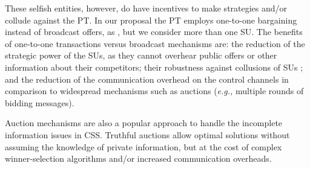 These selfish entities, however, do have incentives to make strategies and/or collude against the PT. 
In our proposal the PT employs one-to-one bargaining instead of broadcast offers, as \cite{ref:Yan2013}, but we consider more than one SU. The benefits of one-to-one transactions versus broadcast mechanisms \cite{ref:Feng2014,ref:Duan2014,ref:Jayaweera2011,ref:Zhang2009,ref:Simeone2008} are: the reduction of the strategic power of the SUs, as they cannot overhear public offers or other information about their competitors; their robustness against collusions of SUs \cite{ref:Alcaraz2014_coa}; and the reduction of the communication overhead on the control channels in comparison to widespread mechanisms such as auctions \cite{ref:Feng2014, ref:Jayaweera2011} (\textit{e.g.,} multiple rounds of bidding messages).

Auction mechanisms are also a popular approach to handle the incomplete information issues in CSS.
Truthful auctions allow optimal solutions without assuming the knowledge of private information, but at the cost of complex winner-selection algorithms and/or increased communication overheads. 
